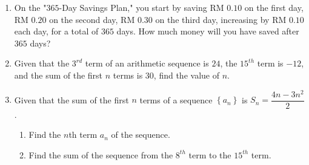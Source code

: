 \documentclass{report}
\begin{document}
    \newpage
    \begin{enumerate}
        \item On the "$365$-Day Savings Plan," you start by saving RM $0.10$ on the first day, RM $0.20$ on the second day, RM $0.30$ on the third day, increasing by RM $0.10$ each day, for a total of $365$ days. How much money will you have saved after $365$ days?
        
        \item Given that the $3^{rd}$ term of an arithmetic sequence is $24$, the $15^{th}$ term is $-12$, and the sum of the first $n$ terms is $30$, find the value of $n$.
    
        \item Given that the sum of the first $n$ terms of a sequence $\left\{a_{n}\right\}$ is $S_{n}=\dfrac{4 n-3 n^{2}}{2}$.
        \begin{enumerate}
            \item Find the $n$th term $a_{n}$ of the sequence.
            \item Find the sum of the sequence from the $8^{th}$ term to the $15^{th}$ term.
        \end{enumerate}
    \end{enumerate}
\end{document}
